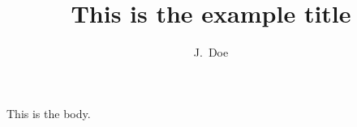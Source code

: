 \documentclass{article}
\title{This is the example title}
\author{J.~Doe}
\begin{document}
This is the body.
\end{document}
